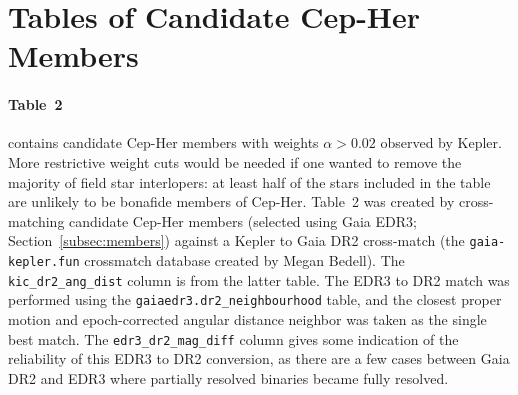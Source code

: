 \documentclass[12pt,twocolumn]{aastex63}
\begin{document}
% 
% 
% 
% 

\clearpage
                            
 

\appendix
\section{Tables of Candidate Cep-Her Members}
\label{app:members}

\paragraph{Table~2} contains candidate Cep-Her members with weights $\alpha>0.02$
observed by Kepler.  More restrictive weight cuts
would be needed if one wanted to remove the majority of field star interlopers: at
least half of the stars included in the table are unlikely
to be bonafide members of Cep-Her.  Table~2  was created by
cross-matching candidate Cep-Her members (selected using Gaia EDR3;
Section~\ref{subsec:members}) against a Kepler to Gaia DR2 cross-match
(the \texttt{gaia-kepler.fun} crossmatch database created by Megan
Bedell).  The \texttt{kic\_dr2\_ang\_dist} column is from the latter
table.  The EDR3 to DR2 match was performed using the
\texttt{gaiaedr3.dr2\_neighbourhood} table, and the closest proper
motion and epoch-corrected angular distance neighbor was taken as the
single best match.  The \texttt{edr3\_dr2\_mag\_diff} column
gives some indication of the reliability of this EDR3 to DR2
conversion, as there are a few cases between Gaia DR2 and EDR3 where
partially resolved binaries became fully resolved.
\end{document}
